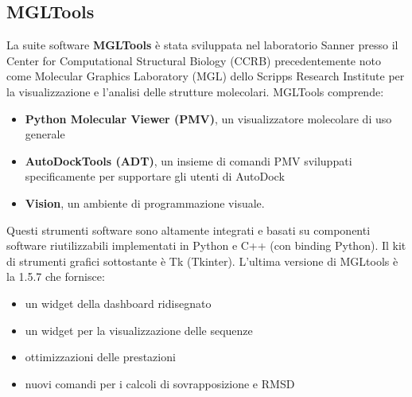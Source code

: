 \subsection{MGLTools}
La suite software \textbf{MGLTools} è stata sviluppata nel laboratorio Sanner presso il Center for Computational Structural Biology (CCRB) precedentemente noto come Molecular Graphics Laboratory (MGL) dello Scripps Research Institute per la visualizzazione e l'analisi delle strutture molecolari. MGLTools comprende:

\begin{itemize}
    \item \textbf{Python Molecular Viewer (PMV)}, un visualizzatore molecolare di uso generale
    \item \textbf{AutoDockTools (ADT)}, un insieme di comandi PMV sviluppati specificamente per supportare gli utenti di AutoDock \label{AutoDockTools}
    \item \textbf{Vision}, un ambiente di programmazione visuale.
\end{itemize}

Questi strumenti software sono altamente integrati e basati su componenti software riutilizzabili implementati in Python e C++ (con binding Python). Il kit di strumenti grafici sottostante è Tk (Tkinter). L'ultima versione di MGLtools è la 1.5.7 che fornisce:

\begin{itemize}
    \item un widget della dashboard ridisegnato
    \item un widget per la visualizzazione delle sequenze
    \item ottimizzazioni delle prestazioni
    \item nuovi comandi per i calcoli di sovrapposizione e RMSD
\end{itemize}

